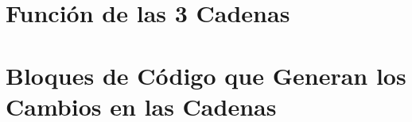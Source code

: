 \section{Función de las 3 Cadenas}


\section{Bloques de Código que Generan los Cambios en las Cadenas}

